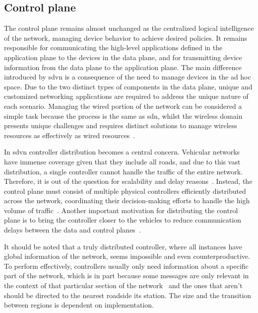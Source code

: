 \subsection{Control plane}
\label{subsec:control_plane}

The control plane remains almost unchanged as the centralized logical intelligence of the network, managing device behavior to achieve desired policies. It remains responsible for communicating the high-level applications defined in the application plane to the devices in the data plane, and for transmitting device information from the data plane to the application plane. The main difference introduced by \gls{sdvn} is a consequence of the need to manage devices in the ad hoc space. Due to the two distinct types of components in the data plane, unique and customized networking applications are required to address the unique nature of each scenario. Managing the wired portion of the network can be considered a simple task because the process is the same as \gls{sdn}, whilst the wireless domain presents unique challenges and requires distinct solutions to manage wireless resources as effectively as wired resources~\cite{cardona_software-defined_2020}.

In \gls{sdvn} controller distribution becomes a central concern. Vehicular networks have immense coverage given that they include all roads, and due to this vast distribution, a single controller cannot handle the traffic of the entire network. Therefore, it is out of the question for scalability and delay reasons~\cite{toufga_openflow_2018}. Instead, the control plane must consist of multiple physical controllers efficiently distributed across the network, coordinating their decision-making efforts to handle the high volume of traffic~\cite{ben_jaballah_security_2020}. Another important motivation for distributing the control plane is to bring the controller closer to the vehicles to reduce communication delays between the data and control planes~\cite{nkenyereye_software-defined_2019}. 

It should be noted that a truly distributed controller, where all instances have global information of the network, seems impossible and even counterproductive. To perform effectively, controllers usually only need information about a specific part of the network, which is in part because some messages are only relevant in the context of that particular section of the network~\cite{cardona_software-defined_2020} and the ones that aren't should be directed to the nearest roadside \gls{its} station. The size and the transition between regions is dependent on implementation. 

